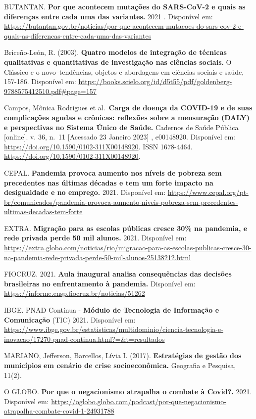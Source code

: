 \documentclass[
]{article}
\begin{document}
BUTANTAN. \textbf{Por que acontecem mutações do SARS-CoV-2 e quais as
diferenças entre cada uma das variantes.} 2021 . Disponível em:
\url{https://butantan.gov.br/noticias/por-que-acontecem-mutacoes-do-sars-cov-2-e-quais-as-diferencas-entre-cada-uma-das-variantes}

Briceño-León, R. (2003). \textbf{Quatro modelos de integração de
técnicas qualitativas e quantitativas de investigação nas ciências
sociais.} O Clássico e o novo--tendências, objetos e abordagens em
ciências sociais e saúde, 157-186. Disponível em:
\url{https://books.scielo.org/id/d5t55/pdf/goldenberg-9788575412510.pdf\#page=157}

Campos, Mônica Rodrigues et al.~\textbf{Carga de doença da COVID-19 e de
suas complicações agudas e crônicas: reflexões sobre a mensuração (DALY)
e perspectivas no Sistema Único de Saúde.} Cadernos de Saúde Pública
{[}online{]}. v. 36, n.~11 {[}Acessado 23 Janeiro 2023{]} , e00148920.
Disponível em: \url{https://doi.org/10.1590/0102-311X00148920}. ISSN
1678-4464. \url{https://doi.org/10.1590/0102-311X00148920}.

CEPAL. \textbf{Pandemia provoca aumento nos níveis de pobreza sem
precedentes nas últimas décadas e tem um forte impacto na desigualdade e
no emprego.} 2021. Disponível em:
\url{https://www.cepal.org/pt-br/comunicados/pandemia-provoca-aumento-niveis-pobreza-sem-precedentes-ultimas-decadas-tem-forte}

EXTRA. \textbf{Migração para as escolas públicas cresce 30\% na
pandemia, e rede privada perde 50 mil alunos.} 2021. Disponível em:
\url{https://extra.globo.com/noticias/rio/migracao-para-as-escolas-publicas-cresce-30-na-pandemia-rede-privada-perde-50-mil-alunos-25138212.html}

FIOCRUZ. 2021. \textbf{Aula inaugural analisa consequências das decisões
brasileiras no enfrentamento à pandemia.} Disponível em:
\url{https://informe.ensp.fiocruz.br/noticias/51262}

IBGE. PNAD Contínua - \textbf{Módulo de Tecnologia de Informação e
Comunicação} (TIC) 2021. Disponível em:
\url{https://www.ibge.gov.br/estatisticas/multidominio/ciencia-tecnologia-e-inovacao/17270-pnad-continua.html?=\&t=resultados}

MARIANO, Jefferson, Barcellos, Lívia I. (2017). \textbf{Estratégias de
gestão dos municípios em cenário de crise socioeconômica.} Geografia e
Pesquisa, 11(2).

O GLOBO. \textbf{Por que o negacionismo atrapalha o combate à Covid?.}
2021. Disponível em:
\url{https://oglobo.globo.com/podcast/por-que-negacionismo-atrapalha-combate-covid-1-24931788}
\end{document}
